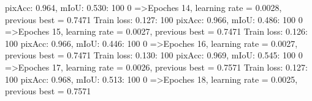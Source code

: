 pixAcc: 0.964, mIoU: 0.530: 100%
  0%
=>Epoches 14, learning rate = 0.0028,                 previous best = 0.7471
Train loss: 0.127: 100%
pixAcc: 0.966, mIoU: 0.486: 100%
  0%
=>Epoches 15, learning rate = 0.0027,                 previous best = 0.7471
Train loss: 0.126: 100%
pixAcc: 0.966, mIoU: 0.446: 100%
  0%
=>Epoches 16, learning rate = 0.0027,                 previous best = 0.7471
Train loss: 0.130: 100%
pixAcc: 0.969, mIoU: 0.545: 100%
  0%
=>Epoches 17, learning rate = 0.0026,                 previous best = 0.7571
Train loss: 0.127: 100%
pixAcc: 0.968, mIoU: 0.513: 100%
  0%
=>Epoches 18, learning rate = 0.0025,                 previous best = 0.7571
